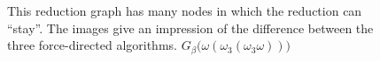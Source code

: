 \begin{figure}[htbp]
{	}
	\caption[$\omega (\omega_3 (\omega_3 \omega))$]
	{This reduction graph has many nodes in which the reduction can ``stay''.
	The images give an impression of the difference between the three force-directed
	algorithms. $G_\beta\big(\omega (\omega_3 (\omega_3 \omega))\big)$}
	\label{fig:images_SelfRef_1_FDP}
\end{figure}

